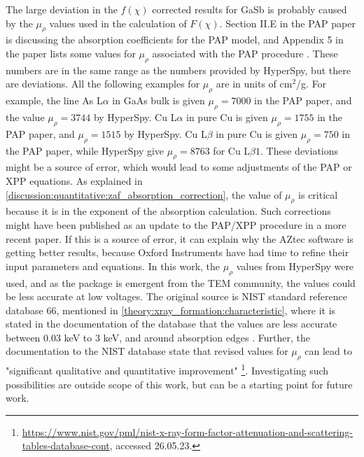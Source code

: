 The large deviation in the $f(\chi)$ corrected results for GaSb is probably caused by the $\mu_\rho$ values used in the calculation of $F(\chi)$.
Section II.E in the PAP paper is discussing the absorption coefficients for the PAP model, and Appendix 5 in the paper lists some values for $\mu_\rho$ associated with the PAP procedure \cite{pap_1991}.
These numbers are in the same range as the numbers provided by HyperSpy, but there are deviations.
All the following examples for $\mu_\rho$ are in units of cm$^2$/g.
For example, the line As L$\alpha$ in GaAs bulk is given $\mu_\rho = 7000$ in the PAP paper, and the value $\mu_\rho = 3744$ by HyperSpy.
Cu L$\alpha$ in pure Cu is given $\mu_\rho = 1755$ in the PAP paper, and $\mu_\rho = 1515$ by HyperSpy.
Cu L$\beta$ in pure Cu is given $\mu_\rho = 750$ in the PAP paper, while HyperSpy give $\mu_\rho = 8763$ for Cu L$\beta1$.
These deviations might be a source of error, which would lead to some adjustments of the PAP or XPP equations.
As explained in \cref{discussion:quantitative:zaf_absorption_correction}, the value of $\mu_\rho$ is critical because it is in the exponent of the absorption calculation.
Such corrections might have been published as an update to the PAP/XPP procedure in a more recent paper.
If this is a source of error, it can explain why the AZtec software is getting better results, because Oxford Instruments have had time to refine their input parameters and equations.
In this work, the $\mu_\rho$ values from HyperSpy were used, and as the package is emergent from the TEM community, the values could be less accurate at low voltages.
The original source is NIST standard reference database 66, mentioned in \cref{theory:xray_formation:characteristic}, where it is stated in the documentation of the database that the values are less accurate between $0.03$ keV to $3$ keV, and around absorption edges \cite{nist_xraydatabase_hyperspy}.
Further, the documentation to the NIST database state that revised values for $\mu_\rho$ can lead to "significant qualitative and quantitative improvement" \cite{nist_xraydatabase_hyperspy}\footnote{\url{https://www.nist.gov/pml/nist-x-ray-form-factor-attenuation-and-scattering-tables-database-cont}, accessed 26.05.23.}.
Investigating such possibilities are outside scope of this work, but can be a starting point for future work.


